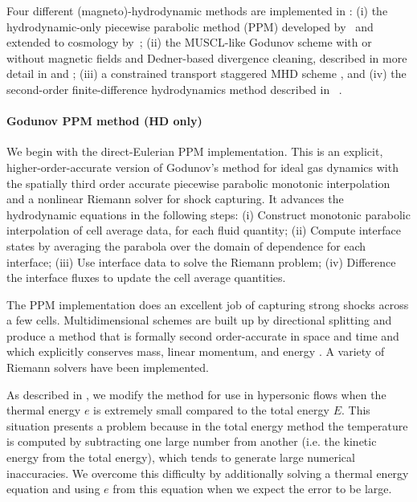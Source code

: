 Four different (magneto)-hydrodynamic methods are implemented in
\enzo: (i) the hydrodynamic-only piecewise parabolic method (PPM)
developed by~\citet{1984JCoPh..54..174C} and extended to cosmology
by~\citet{1995CoPhC..89..149B}; (ii) the MUSCL-like Godunov scheme
\citep{1977JCoPh..23..276V} with or without magnetic fields and Dedner-based
divergence cleaning, described in more detail in
\citet{WangAbelZhang08} and \citet{WangAbel09}; (iii) a constrained
transport staggered MHD scheme \citep{Collins10}, and (iv) the
second-order finite-difference hydrodynamics method described in
\zeus~\citep{Stone92a,Stone92b}.

\paragraph{Godunov PPM method (HD only)}

We begin with the direct-Eulerian PPM implementation.  This is an
explicit, higher-order-accurate version of Godunov's method for ideal
gas dynamics with the spatially third order accurate piecewise parabolic monotonic
interpolation and a nonlinear Riemann solver for shock capturing.  It
advances the hydrodynamic equations in the following steps:
(i) Construct monotonic parabolic interpolation of cell average data,
for each fluid quantity;
(ii) Compute interface states by averaging the parabola over the
domain of dependence for each interface;
(iii) Use interface data to solve the Riemann problem;
(iv) Difference the interface fluxes to update the cell average
quantities.

The PPM implementation does an excellent job of capturing strong
shocks across a few cells.  Multidimensional schemes are built up by
directional splitting and produce a method that is formally second
order-accurate in space and time and which explicitly conserves mass,
linear momentum, and energy \citep{Hawley84, Norman86}.  A variety of
Riemann solvers have been implemented.

As described in \citet{Bryan95}, we modify the method for use in
hypersonic flows when the thermal energy $e$ is extremely small
compared to the total energy $E$.  This situation presents a problem
because in the total energy method the temperature is computed by
subtracting one large number from another (i.e. the kinetic energy
from the total energy), which tends to generate large numerical
inaccuracies. We overcome this difficulty by additionally solving a
thermal energy equation and using $e$ from this equation when we
expect the error to be large.

